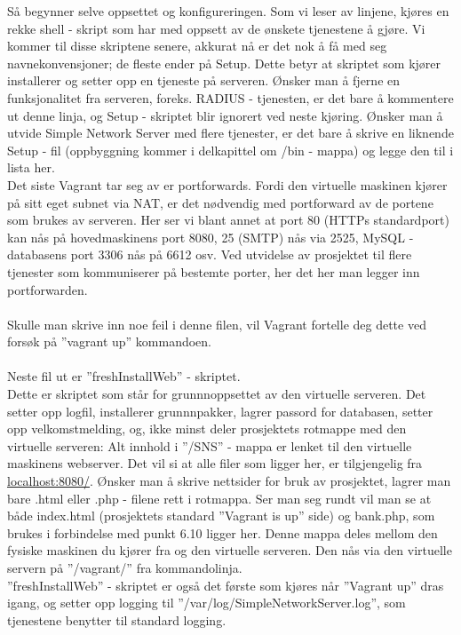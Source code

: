 \documentclass{article}
\begin{document}
Så begynner selve oppsettet og konfigureringen. Som vi leser av linjene, kjøres en rekke shell - skript som har med oppsett av de ønskete tjenestene å gjøre. Vi kommer til disse skriptene senere, akkurat nå er det nok å få med seg navnekonvensjoner; de fleste ender på Setup. Dette betyr at skriptet som kjører installerer og setter opp en tjeneste på serveren. Ønsker man å fjerne en funksjonalitet fra serveren, foreks. RADIUS - tjenesten, er det bare å kommentere ut denne linja, og Setup - skriptet blir ignorert ved neste kjøring. Ønsker man å utvide Simple Network Server med flere tjenester, er det bare å skrive en liknende Setup - fil (oppbyggning kommer i delkapittel om /bin - mappa) og legge den til i lista her. \\
Det siste Vagrant tar seg av er portforwards. Fordi den virtuelle maskinen kjører på sitt eget subnet via NAT, er det nødvendig med portforward av de portene som brukes av serveren. Her ser vi blant annet at port 80 (HTTPs standardport) kan nås på hovedmaskinens port 8080, 25 (SMTP) nås via 2525, MySQL - databasens port 3306 nås på 6612 osv. Ved utvidelse av prosjektet til flere tjenester som kommuniserer på bestemte porter, her det her man legger inn portforwarden. \\ \\
Skulle man skrive inn noe feil i denne filen, vil Vagrant fortelle deg dette ved forsøk på ''vagrant up'' kommandoen. 
\\ \\
Neste fil ut er ''freshInstallWeb'' - skriptet. \\
Dette er skriptet som står for grunnnoppsettet av den virtuelle serveren. Det setter opp logfil, installerer grunnnpakker, lagrer passord for databasen, setter opp velkomstmelding, og, ikke minst deler prosjektets rotmappe med den virtuelle serveren: Alt innhold i ''/SNS'' - mappa er lenket til den virtuelle maskinens webserver. Det vil si at alle filer som ligger her, er tilgjengelig fra \url{localhost:8080/}. Ønsker man å skrive nettsider for bruk av prosjektet, lagrer man bare .html eller .php - filene rett i rotmappa. Ser man seg rundt vil man se at både index.html (prosjektets standard ''Vagrant is up'' side) og bank.php, som brukes i forbindelse med punkt 6.10 ligger her. Denne mappa deles mellom den fysiske maskinen du kjører fra og den virtuelle serveren. Den nås via den virtuelle servern på ''/vagrant/'' fra kommandolinja. \\
''freshInstallWeb'' - skriptet er også det første som kjøres når ''Vagrant up'' dras igang, og setter opp logging til
''/var/log/SimpleNetworkServer.log'', som tjenestene benytter til standard logging.
\end{document}
